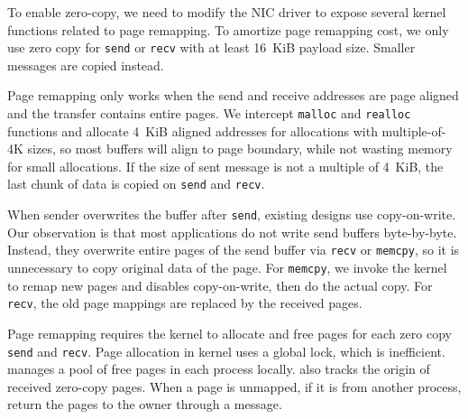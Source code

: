 
To enable zero-copy, we need to modify the NIC driver to expose several kernel functions related to page remapping. 
To amortize page remapping cost, we only use zero copy for \texttt{send} or \texttt{recv} with at least 16~KiB payload size.
Smaller messages are copied instead.

Page remapping only works when the send and receive addresses are page aligned and the transfer contains entire pages.
We intercept \texttt{malloc} and \texttt{realloc} functions and allocate 4~KiB aligned addresses for allocations with multiple-of-4K sizes, so most buffers will align to page boundary, while not wasting memory for small allocations.
If the size of sent message is not a multiple of 4~KiB, the last chunk of data is copied on \texttt{send} and \texttt{recv}.



When sender overwrites the buffer after \texttt{send}, existing designs use copy-on-write. %
Our observation is that most applications do not write send buffers byte-by-byte. Instead, they overwrite entire pages of the send buffer via \texttt{recv} or \texttt{memcpy}, so it is unnecessary to copy original data of the page.
For \texttt{memcpy}, we invoke the kernel to remap new pages and disables copy-on-write, then do the actual copy.
For \texttt{recv}, the old page mappings are replaced by the received pages.


Page remapping requires the kernel to allocate and free pages for each zero copy \texttt{send} and \texttt{recv}. 
Page allocation in kernel uses a global lock, which is inefficient. \libipc{} manages a pool of free pages in each process locally.
\libipc{} also tracks the origin of received zero-copy pages.
When a page is unmapped, if it is from another process, \libipc{} return the pages to the owner through a message.

